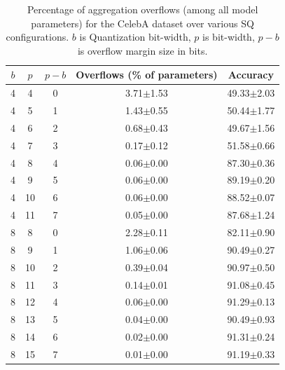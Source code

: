 \begin{table}[!ht]
    \caption{Percentage of aggregation overflows (among all model parameters) for the CelebA dataset over various SQ configurations. $b$ is Quantization bit-width, $p$ is \SecAgg bit-width, $p-b$ is overflow margin size in bits.}
    \centering
    \begin{tabular}{ccccc}
    \toprule
    $b$ & $p$ & $p - b$ & Overflows (\% of parameters) & Accuracy \\
    \midrule
        4 & 4 & 0 & 3.71$\pm$1.53 & 49.33$\pm$2.03 \\
        4 & 5 & 1 & 1.43$\pm$0.55 & 50.44$\pm$1.77 \\
        4 & 6 & 2 & 0.68$\pm$0.43 & 49.67$\pm$1.56 \\
        4 & 7 & 3 & 0.17$\pm$0.12 & 51.58$\pm$0.66 \\
        4 & 8 & 4 & 0.06$\pm$0.00 & 87.30$\pm$0.36 \\
        4 & 9 & 5 & 0.06$\pm$0.00 & 89.19$\pm$0.20 \\
        4 & 10 & 6 & 0.06$\pm$0.00 & 88.52$\pm$0.07 \\
        4 & 11 & 7 & 0.05$\pm$0.00 & 87.68$\pm$1.24 \\
        \midrule 
        8 & 8 & 0 & 2.28$\pm$0.11 & 82.11$\pm$0.90 \\
        8 & 9 & 1 & 1.06$\pm$0.06 & 90.49$\pm$0.27 \\
        8 & 10 & 2 & 0.39$\pm$0.04 & 90.97$\pm$0.50 \\
        8 & 11 & 3 & 0.14$\pm$0.01 & 91.08$\pm$0.45 \\
        8 & 12 & 4 & 0.06$\pm$0.00 & 91.29$\pm$0.13 \\
        8 & 13 & 5 & 0.04$\pm$0.00 & 90.49$\pm$0.93 \\
        8 & 14 & 6 & 0.02$\pm$0.00 & 91.31$\pm$0.24 \\
        8 & 15 & 7 & 0.01$\pm$0.00 & 91.19$\pm$0.33 \\
        \bottomrule
    \end{tabular}
    \label{tab:celeba_overflows}
\end{table}

